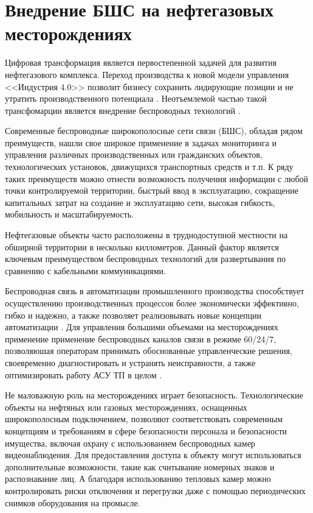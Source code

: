 \chapter{Внедрение БШС на нефтегазовых месторождениях}\label{ch:ch1}


Цифровая трансформация является первостепенной задачей для развития нефтегазового комплекса. Переход производства к новой модели управления <<Индустрия 4.0>> позволит бизнесу сохранить лидирующие позиции и не утратить производственного потенциала  \cite{Eremin2020, Dmitrievskiy2020}. Неотъемлемой частью такой трансфомарции является внедрение беспроводных технологий \cite{Eremin2020, Dmitrievskiy2020, Eremin2019, Hiriyannaiah2020, Munirathinam2020, CarmenLucas-Estan2018}. 


Современные беспроводные широкополосные сети связи (БШС), обладая рядом преимуществ, нашли свое широкое применение в задачах мониторинга и управления различных   производственных или гражданских объектов, технологических установок, движущихся транспортных средств и т.п. К ряду таких преимуществ можно отнести возможность получения информации с любой точки контролируемой территории, быстрый ввод в эксплуатацию, сокращение капитальных затрат на создание и эксплуатацию сети, высокая гибкость, мобильность и масштабируемость. 


Нефтегазовые объекты часто расположены в труднодоступной местности на обширной территории в несколько киллометров. Данный фактор является ключевым преимуществом беспроводных технологий для развертывания по сравнению с кабельными коммуникациями.

Беспроводная связь в автоматизации промышленного производства способствует осуществлению производственных процессов более экономически эффективно, гибко и надежно, а также позволяет реализовывать новые концепции автоматизации \cite{Gost62657}. Для управления большими объемами на месторождениях применение применение беспроводных каналов связи в режиме 60/24/7, позволяюшая операторам принимать обоснованные управленческие решения, своевременно диагностировать и устранять неисправности, а также оптимизировать работу АСУ ТП в целом \cite{Dmitrievsky2021}.

Не маловажную роль на месторождениях играет безопасность. Технологические объекты на нефтяных или газовых месторождениях, оснащенных широкополосным подключением, позволяют соответствовать современным концепциям и требованиям в сфере безопасности персонала и безопасности имущества, включая охрану с использованием беспроводных камер видеонаблюдения. Для предоставления доступа к объекту могут использоваться дополнительные возможности, такие как считывание номерных знаков и распознавание лиц. А благодаря использованию тепловых камер можно контролировать риски отключения и перегрузки даже с помощью периодических снимков оборудования на промысле. 

